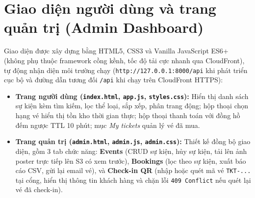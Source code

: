 \section{Giao diện người dùng và trang quản trị (Admin Dashboard)}
Giao diện được xây dựng bằng HTML5, CSS3 và Vanilla JavaScript ES6+ (không phụ thuộc framework cồng kềnh, tốc độ tải cực nhanh qua CloudFront), tự động nhận diện môi trường chạy (\texttt{http://127.0.0.1:8000/api} khi phát triển cục bộ và đường dẫn tương đối \texttt{/api} khi chạy trên CloudFront HTTPS):
\begin{itemize}[leftmargin=1.5em]
  \item \textbf{Trang người dùng (\texttt{index.html}, \texttt{app.js}, \texttt{styles.css}):} Hiển thị danh sách sự kiện kèm tìm kiếm, lọc thể loại, sắp xếp, phân trang động; hộp thoại chọn hạng vé hiển thị tồn kho thời gian thực; hộp thoại thanh toán với đồng hồ đếm ngược TTL 10 phút; mục \textit{My tickets} quản lý vé đã mua.
  \item \textbf{Trang quản trị (\texttt{admin.html}, \texttt{admin.js}, \texttt{admin.css}):} Thiết kế đồng bộ giao diện, gồm 3 tab chức năng: \textbf{Events} (CRUD sự kiện, hủy sự kiện, tải lên ảnh poster trực tiếp lên S3 có xem trước), \textbf{Bookings} (lọc theo sự kiện, xuất báo cáo CSV, gửi lại email vé), và \textbf{Check-in QR} (nhập hoặc quét mã vé \texttt{TKT-...} tại cổng, hiển thị thông tin khách hàng và chặn lỗi \texttt{409 Conflict} nếu quét lại vé đã check-in).
\end{itemize}




